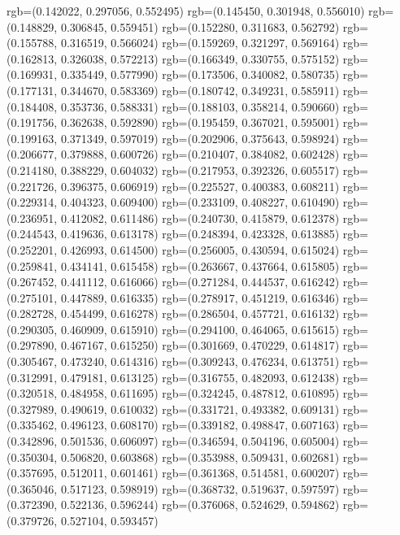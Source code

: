 {{{					rgb=(0.142022, 0.297056, 0.552495)
					rgb=(0.145450, 0.301948, 0.556010)
					rgb=(0.148829, 0.306845, 0.559451)
					rgb=(0.152280, 0.311683, 0.562792)
					rgb=(0.155788, 0.316519, 0.566024)
					rgb=(0.159269, 0.321297, 0.569164)
					rgb=(0.162813, 0.326038, 0.572213)
					rgb=(0.166349, 0.330755, 0.575152)
					rgb=(0.169931, 0.335449, 0.577990)
					rgb=(0.173506, 0.340082, 0.580735)
					rgb=(0.177131, 0.344670, 0.583369)
					rgb=(0.180742, 0.349231, 0.585911)
					rgb=(0.184408, 0.353736, 0.588331)
					rgb=(0.188103, 0.358214, 0.590660)
					rgb=(0.191756, 0.362638, 0.592890)
					rgb=(0.195459, 0.367021, 0.595001)
					rgb=(0.199163, 0.371349, 0.597019)
					rgb=(0.202906, 0.375643, 0.598924)
					rgb=(0.206677, 0.379888, 0.600726)
					rgb=(0.210407, 0.384082, 0.602428)
					rgb=(0.214180, 0.388229, 0.604032)
					rgb=(0.217953, 0.392326, 0.605517)
					rgb=(0.221726, 0.396375, 0.606919)
					rgb=(0.225527, 0.400383, 0.608211)
					rgb=(0.229314, 0.404323, 0.609400)
					rgb=(0.233109, 0.408227, 0.610490)
					rgb=(0.236951, 0.412082, 0.611486)
					rgb=(0.240730, 0.415879, 0.612378)
					rgb=(0.244543, 0.419636, 0.613178)
					rgb=(0.248394, 0.423328, 0.613885)
					rgb=(0.252201, 0.426993, 0.614500)
					rgb=(0.256005, 0.430594, 0.615024)
					rgb=(0.259841, 0.434141, 0.615458)
					rgb=(0.263667, 0.437664, 0.615805)
					rgb=(0.267452, 0.441112, 0.616066)
					rgb=(0.271284, 0.444537, 0.616242)
					rgb=(0.275101, 0.447889, 0.616335)
					rgb=(0.278917, 0.451219, 0.616346)
					rgb=(0.282728, 0.454499, 0.616278)
					rgb=(0.286504, 0.457721, 0.616132)
					rgb=(0.290305, 0.460909, 0.615910)
					rgb=(0.294100, 0.464065, 0.615615)
					rgb=(0.297890, 0.467167, 0.615250)
					rgb=(0.301669, 0.470229, 0.614817)
					rgb=(0.305467, 0.473240, 0.614316)
					rgb=(0.309243, 0.476234, 0.613751)
					rgb=(0.312991, 0.479181, 0.613125)
					rgb=(0.316755, 0.482093, 0.612438)
					rgb=(0.320518, 0.484958, 0.611695)
					rgb=(0.324245, 0.487812, 0.610895)
					rgb=(0.327989, 0.490619, 0.610032)
					rgb=(0.331721, 0.493382, 0.609131)
					rgb=(0.335462, 0.496123, 0.608170)
					rgb=(0.339182, 0.498847, 0.607163)
					rgb=(0.342896, 0.501536, 0.606097)
					rgb=(0.346594, 0.504196, 0.605004)
					rgb=(0.350304, 0.506820, 0.603868)
					rgb=(0.353988, 0.509431, 0.602681)
					rgb=(0.357695, 0.512011, 0.601461)
					rgb=(0.361368, 0.514581, 0.600207)
					rgb=(0.365046, 0.517123, 0.598919)
					rgb=(0.368732, 0.519637, 0.597597)
					rgb=(0.372390, 0.522136, 0.596244)
					rgb=(0.376068, 0.524629, 0.594862)
					rgb=(0.379726, 0.527104, 0.593457)
}}}
